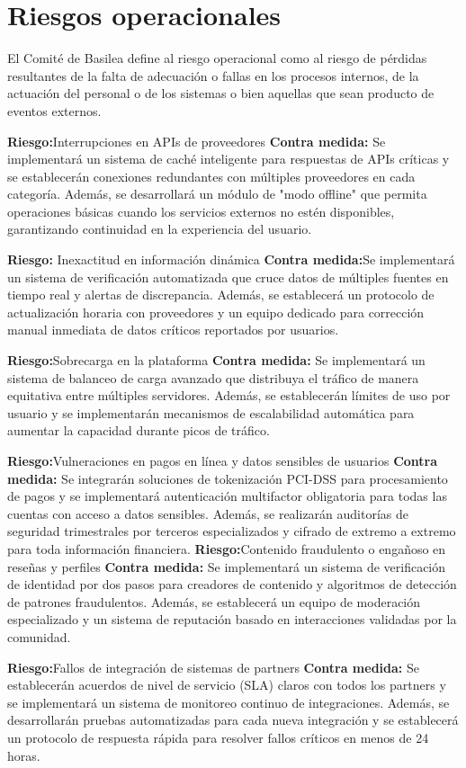 \section{Riesgos operacionales}
El Comité de Basilea define al riesgo operacional como al riesgo de pérdidas resultantes de la falta de adecuación o fallas en los procesos internos, de la actuación del personal o de los sistemas o bien aquellas que sean producto de eventos externos.

\textbf{Riesgo:}Interrupciones en APIs de proveedores
\textbf{Contra medida:} Se implementará un sistema de caché inteligente para respuestas de APIs críticas y se establecerán conexiones redundantes con múltiples proveedores en cada categoría. Además, se desarrollará un módulo de "modo offline" que permita operaciones básicas cuando los servicios externos no estén disponibles, garantizando continuidad en la experiencia del usuario.

\textbf{Riesgo:} Inexactitud en información dinámica
\textbf{Contra medida:}Se implementará un sistema de verificación automatizada que cruce datos de múltiples fuentes en tiempo real y alertas de discrepancia. Además, se establecerá un protocolo de actualización horaria con proveedores y un equipo dedicado para corrección manual inmediata de datos críticos reportados por usuarios.

\textbf{Riesgo:}Sobrecarga en la plataforma
\textbf{Contra medida:} Se implementará un sistema de balanceo de carga avanzado que distribuya el tráfico de manera equitativa entre múltiples servidores. Además, se establecerán límites de uso por usuario y se implementarán mecanismos de escalabilidad automática para aumentar la capacidad durante picos de tráfico.

\textbf{Riesgo:}Vulneraciones en pagos en línea y datos sensibles de usuarios
\textbf{Contra medida:} Se integrarán soluciones de tokenización PCI-DSS para procesamiento de pagos y se implementará autenticación multifactor obligatoria para todas las cuentas con acceso a datos sensibles. Además, se realizarán auditorías de seguridad trimestrales por terceros especializados y cifrado de extremo a extremo para toda información financiera.
\textbf{Riesgo:}Contenido fraudulento o engañoso en reseñas y perfiles
\textbf{Contra medida:} Se implementará un sistema de verificación de identidad por dos pasos para creadores de contenido y algoritmos de detección de patrones fraudulentos. Además, se establecerá un equipo de moderación especializado y un sistema de reputación basado en interacciones validadas por la comunidad.

\textbf{Riesgo:}Fallos de integración de sistemas de partners
\textbf{Contra medida:} Se establecerán acuerdos de nivel de servicio (SLA) claros con todos los partners y se implementará un sistema de monitoreo continuo de integraciones. Además, se desarrollarán pruebas automatizadas para cada nueva integración y se establecerá un protocolo de respuesta rápida para resolver fallos críticos en menos de 24 horas.
